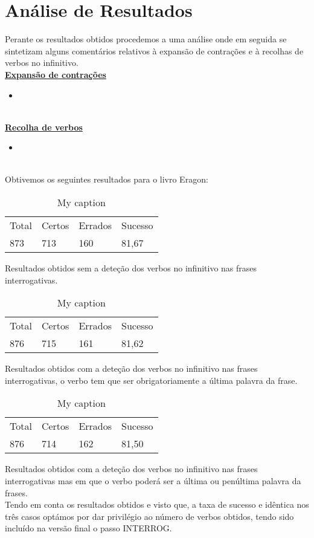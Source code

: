 \documentclass{report}
\begin{document}
\chapter{Análise de Resultados}
Perante os resultados obtidos procedemos a uma análise onde em seguida se sintetizam alguns comentários relativos à expansão de contrações e à recolhas de verbos no infinitivo.
\\
\textbf{\underline{Expansão de contrações}}
\\
\begin{itemize}
      \item
\end{itemize}
\\
\textbf{\underline{Recolha de verbos}}
\\
\begin{itemize}
      \item
\end{itemize}
\\
Obtivemos os seguintes resultados para o livro Eragon:
\begin{table}[]
\centering
\caption{My caption}
\label{my-label}
\begin{tabular}{llll}
Total & Certos & Errados & Sucesso \\
873   & 713    & 160     & 81,67
\end{tabular}
\end{table}
Resultados obtidos sem a deteção dos verbos no infinitivo nas frases interrogativas.
\\
\begin{table}[]
\centering
\caption{My caption}
\label{my-label}
\begin{tabular}{llll}
Total & Certos & Errados & Sucesso \\
876   & 715    & 161     & 81,62
\end{tabular}
\end{table}
Resultados obtidos com a deteção dos verbos no infinitivo nas frases interrogativas, o verbo tem que ser obrigatoriamente a última palavra da frase.
\\
\begin{table}[]
\centering
\caption{My caption}
\label{my-label}
\begin{tabular}{llll}
Total & Certos & Errados & Sucesso \\
876   & 714    & 162     & 81,50
\end{tabular}
\end{table}
Resultados obtidos com a deteção dos verbos no infinitivo nas frases interrogativas mas em que o verbo poderá ser a última ou penúltima palavra da frases.
\\
Tendo em conta os resultados obtidos e visto que, a taxa de sucesso e idêntica nos três casos optámos por dar privilégio ao número de verbos obtidos, tendo sido incluído na versão final o passo INTERROG.
\end{document}

